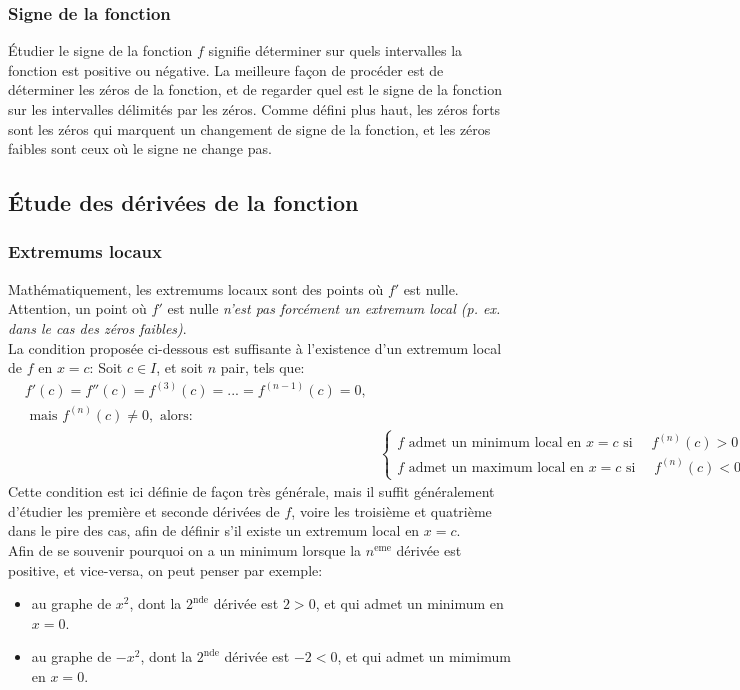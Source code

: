 \documentclass{article}
\numberwithin{equation}{section}
\begin{document}
\subsubsection{Signe de la fonction}
Étudier le signe de la fonction \(f\) signifie déterminer sur quels intervalles la fonction est positive ou négative. La meilleure façon de procéder est de déterminer les zéros de la fonction, et de regarder quel est le signe de la fonction sur les intervalles délimités par les zéros. Comme défini plus haut, les zéros forts sont les zéros qui marquent un changement de signe de la fonction, et les zéros faibles sont ceux où le signe ne change pas.

\subsection{Étude des dérivées de la fonction}

\subsubsection{Extremums locaux}
Mathématiquement, les extremums locaux sont des points où \(f'\) est nulle. Attention, un point où \(f'\) est nulle \emph{n'est pas forcément un extremum local (p. ex. dans le cas des zéros faibles)}. \\

La condition proposée ci-dessous est suffisante à l'existence d'un extremum local de \(f\) en \(x = c\):
Soit \(c \in I\), et soit \(n\) pair, tels que:
\begin{align*}
	&f'(c) = f''(c) = f^{(3)}(c) = ... = f^{(n-1)}(c) = 0, \\ 
	&\text{ mais } f^{(n)}(c) \neq 0, \text{ alors:} \\
	& &\begin{cases}
		f \text{ admet un minimum local en } x = c \text{ si } \quad f^{(n)}(c) > 0  \\
		f \text{ admet un maximum local en } x = c \text{ si } \quad f^{(n)}(c) < 0  
	\end{cases}
\end{align*}
Cette condition est ici définie de façon très générale, mais il suffit généralement d'étudier les première et seconde dérivées de \(f\), voire les troisième et quatrième dans le pire des cas, afin de définir s'il existe un extremum local en \(x = c\). \\
Afin de se souvenir pourquoi on a un minimum lorsque la \(n^\text{eme}\) dérivée est positive, et vice-versa, on peut penser par exemple:
\begin{itemize}
	\item au graphe de \(x^2\), dont la \(2^\text{nde}\) dérivée est \(2 > 0\), et qui admet un minimum en \(x = 0\).
	\item au graphe de \(-x^2\), dont la \(2^\text{nde}\) dérivée est  \(-2 < 0\), et qui admet un mimimum en \(x = 0\).
\end{itemize}
\end{document}
